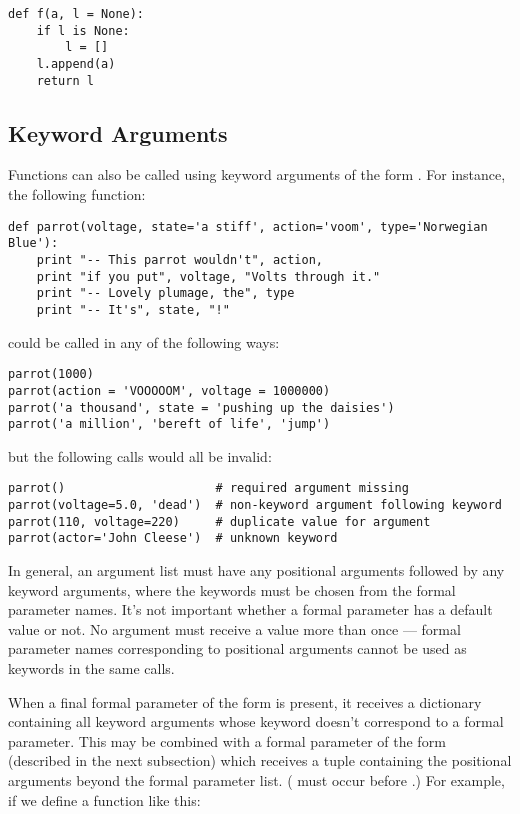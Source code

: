 \documentclass{manual}
\begin{document}
\begin{verbatim}
def f(a, l = None):
    if l is None:
        l = []
    l.append(a)
    return l
\end{verbatim}

\subsection{Keyword Arguments \label{keywordArgs}}

Functions can also be called using
keyword arguments of the form .  For
instance, the following function:

\begin{verbatim}
def parrot(voltage, state='a stiff', action='voom', type='Norwegian Blue'):
    print "-- This parrot wouldn't", action,
    print "if you put", voltage, "Volts through it."
    print "-- Lovely plumage, the", type
    print "-- It's", state, "!"
\end{verbatim}

could be called in any of the following ways:

\begin{verbatim}
parrot(1000)
parrot(action = 'VOOOOOM', voltage = 1000000)
parrot('a thousand', state = 'pushing up the daisies')
parrot('a million', 'bereft of life', 'jump')
\end{verbatim}

but the following calls would all be invalid:

\begin{verbatim}
parrot()                     # required argument missing
parrot(voltage=5.0, 'dead')  # non-keyword argument following keyword
parrot(110, voltage=220)     # duplicate value for argument
parrot(actor='John Cleese')  # unknown keyword
\end{verbatim}

In general, an argument list must have any positional arguments
followed by any keyword arguments, where the keywords must be chosen
from the formal parameter names.  It's not important whether a formal
parameter has a default value or not.  No argument must receive a
value more than once --- formal parameter names corresponding to
positional arguments cannot be used as keywords in the same calls.

When a final formal parameter of the form  is
present, it receives a dictionary containing all keyword arguments
whose keyword doesn't correspond to a formal parameter.  This may be
combined with a formal parameter of the form 
(described in the next subsection) which receives a tuple containing
the positional arguments beyond the formal parameter list.
( must occur before .)  For
example, if we define a function like this:
\end{document}
